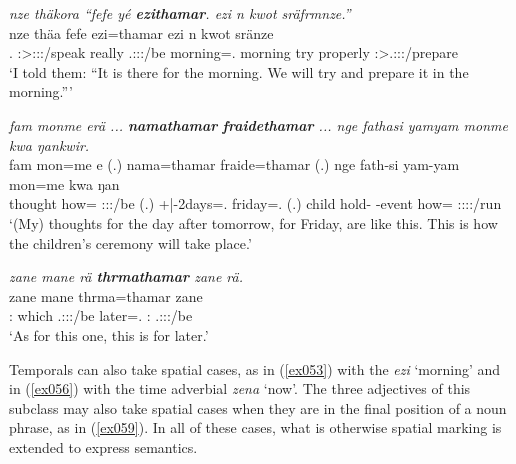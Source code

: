 \begin{exe}
	\ex \emph{nze thäkora ``fefe yé \textbf{ezithamar}. ezi n kwot sräfrmnze.''}\\
	\gll nze thäa fefe  ezi=thamar ezi n kwot sränze\\
	\Fsg.{\Erg} \Fsg:\Sbj>\Stpl:\Obj:\Pst:\Pfv/speak really \Tsg.\Masc:\Sbj:\Nonpast:\Ipfv/be morning=\Temp.{\Purp} morning try properly \Fpl:\Sbj>\Tsg.\Masc:\Obj:\Irr:\Ipfv/prepare\\
	\trans `I told them: ``It is there for the morning. We will try and prepare it in the morning.''' 
	\label{ex057}
\end{exe}
\begin{exe}
	\ex \emph{fam monme erä ... \textbf{namathamar} \textbf{fraidethamar} ... nge fathasi yamyam monme kwa ŋankwir.}\\
	\gll fam mon=me e (.) nama=thamar fraide=thamar (.) nge fath-si yam-yam mon=me kwa ŋan\\
	thought how={\Ins} \Stpl:\Sbj:\Nonpast:\Ipfv/be (.) +|-2days=\Temp.{\Purp} friday=\Temp.{\Purp} (.) child hold-{\Nmlz} \Redup-event how={\Ins} {\Fut} \Stsg:\Sbj:\Nonpast:\Ipfv:\Venit/run\\
	\trans `(My) thoughts for the day after tomorrow, for Friday, are like this. This is how the children's ceremony will take place.' 
	\label{ex055}
\end{exe}
\begin{exe}
	\ex \emph{zane mane rä \textbf{thrmathamar} zane rä.}\\
	\gll zane mane  thrma=thamar zane \\
	\Dem:{\Prox} which \Tsg.\F:\Sbj:\Nonpast:\Ipfv/be later=\Temp.{\Purp} \Dem:{\Prox} \Tsg.\F:\Sbj:\Nonpast:\Ipfv/be\\
	\trans `As for this one, this is for later.' 
	\label{ex058}
\end{exe}

Temporals can also take spatial cases, as in (\ref{ex053}) with the   \emph{ezi} `morning' and in (\ref{ex056}) with the time adverbial \emph{zena} `now'. The three adjectives of this subclass may also take spatial cases when they are in the final position of a noun phrase, as in (\ref{ex059}). In all of these cases, what is otherwise spatial marking is extended to express  semantics.

